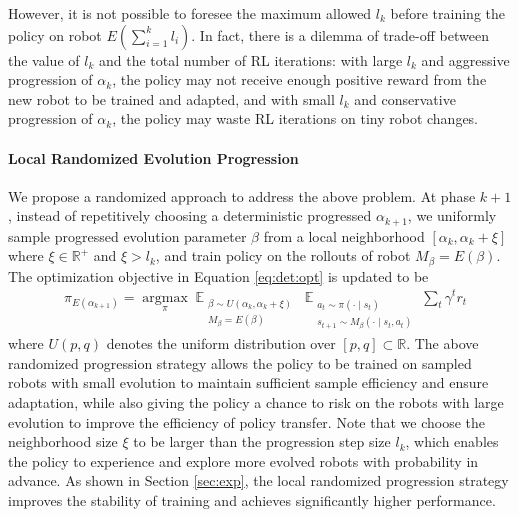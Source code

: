 \documentclass[nohyperref]{article}
\theoremstyle{plain}
\theoremstyle{definition}
\theoremstyle{remark}
\begin{document}
However, it is not possible to foresee the maximum allowed $l_k$ before training the policy on robot $E(\sum_{i=1}^k l_i)$.
In fact, there is a dilemma of trade-off between the value of $l_k$ and the total number of RL iterations:
with large $l_k$ and aggressive progression of $\alpha_k$, the policy may not receive enough positive reward from the new robot to be trained and adapted, 
and with small $l_k$ and conservative progression of $\alpha_k$, the policy may waste RL iterations on tiny robot changes.



\paragraph{Local Randomized Evolution Progression }
We propose a randomized approach to address the above problem.
At phase $k+1$, instead of repetitively choosing a deterministic progressed $\alpha_{k+1}$, we uniformly sample progressed evolution parameter $\beta$ from a local neighborhood $[\alpha_k, \alpha_k + \xi]$ where $\xi \in \mathbb{R}^+$ and $\xi > l_k$, and train policy on the rollouts of robot $M_\beta = E(\beta)$.
The optimization objective in Equation \eqref{eq:det:opt} is updated to be
\begin{equation} \label{eq:random:opt}
\begin{split}
    & \pi_{E(\alpha_{k+1})} = 
    \mathop{\arg \max}\limits_{\pi}
    \mathop{\mathbb{E}}_{ 
    \substack{
    \beta \sim U(\alpha_k, \alpha_k + \xi) \\
    M_\beta = E(\beta)
    }}
    \mathop{\mathbb{E}}_{ 
    \substack{a_t \sim \pi(\cdot \mid s_t) \\ 
    s_{t+1} \sim M_\beta(\cdot \mid s_t, a_t)}}
    \sum_{t} \gamma^t r_t 
\end{split}
\end{equation}
where $U(p, q)$ denotes the uniform distribution over $[p,q] \subset \mathbb{R}$.
The above randomized progression strategy allows the policy to be trained on sampled robots with small evolution to maintain sufficient sample efficiency and ensure adaptation, while also giving the policy a chance to risk on the robots with large evolution to improve the efficiency of policy transfer.
Note that we choose the neighborhood size $\xi$ to be larger than the progression step size $l_k$, which enables the policy to experience and explore more evolved robots with probability in advance.
As shown in Section \ref{sec:exp}, the local randomized progression strategy improves the stability of training and achieves significantly higher performance.
\end{document}
